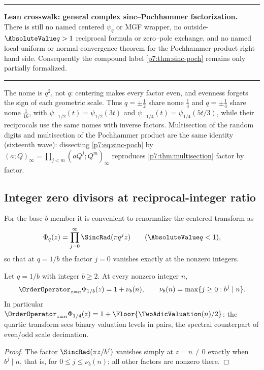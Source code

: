 \documentclass[11pt,oneside]{article}
\numberwithin{equation}{section}
\theoremstyle{definition}
\theoremstyle{remark}
\newenvironment{statusbox}[1]{%
  \par\medskip\noindent\begin{center}\begin{minipage}{0.94\textwidth}%
  \color{linkblue}\hrule\vspace{0.65em}%
  \color{black}\textbf{\color{linkblue}#1.}\ }{%
  \par\vspace{0.65em}\color{linkblue}\hrule
  \end{minipage}\end{center}\medskip}
\begin{document}
\begin{statusbox}{Lean crosswalk: general complex sinc--Pochhammer factorization}
There is still no named centered $\psi_q$ or MGF wrapper, no
outside-$\AbsoluteValue q>1$ reciprocal formula or zero--pole exchange, and no named
local-uniform or normal-convergence theorem for the Pochhammer-product
right-hand side.  Consequently the compound label
\cref{p7:thm:sinc-poch} remains only partially formalized.
\end{statusbox}

The nome is $q^2$, not $q$: centering makes every factor even, and evenness
forgets the sign of each geometric scale.  Thus $q=\pm\tfrac12$ share nome
$\tfrac14$ and $q=\pm\tfrac14$ share nome $\tfrac1{16}$, with
$\psi_{-1/2}(t)=\psi_{1/2}(3t)$ and $\psi_{-1/4}(t)=\psi_{1/4}(5t/3)$, while
their reciprocals use the same nomes with inverse factors.  Multisection of
the random digits and multisection of the Pochhammer product are the same
identity (sixteenth wave): dissecting \eqref{p7:eq:sinc-poch} by
$(a;Q)_\infty=\prod_{j<m}(aQ^j;Q^m)_\infty$ reproduces
\cref{p7:thm:multisection} factor by factor.

\subsection{Integer zero divisors at reciprocal-integer ratio}

For the base-$b$ member it is convenient to renormalize the centered
transform as
\begin{equation}\label{p7:eq:Phi-q}
 \Phi_q(z)=\prod_{j=0}^{\infty}\SincRad(\pi q^jz)
 \qquad(\AbsoluteValue q<1),
\end{equation}
so that at $q=1/b$ the factor $j=0$ vanishes exactly at the nonzero integers.

\begin{proposition}
\label{p7:prop:base-b-zero}
Let $q=1/b$ with integer $b\ge2$.  At every nonzero integer $n$,
\begin{equation}\label{p7:eq:base-b-zero}
 \OrderOperator_{z=n}\Phi_{1/b}(z)=1+\nu_b(n),
 \qquad
 \nu_b(n)=\max\{j\ge0:b^j\mid n\}.
\end{equation}
In particular $\OrderOperator_{z=n}\Phi_{1/4}(z)=1+\Floor{\TwoAdicValuation(n)/2}$: the quartic
transform sees binary valuation levels in pairs, the spectral counterpart of
even/odd scale decimation.
\end{proposition}

\begin{proof}
The factor $\SincRad(\pi z/b^j)$ vanishes simply at $z=n\ne0$ exactly when
$b^j\mid n$, that is, for $0\le j\le\nu_b(n)$; all other factors are nonzero
there.
\end{proof}
\end{document}
